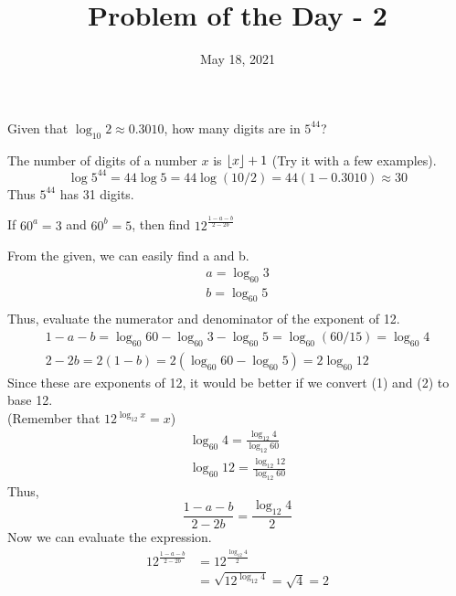 \documentclass[answers]{exam}
\title{Problem of the Day - 2}
\date{May 18, 2021}
\DeclarePairedDelimiter\floor{\lfloor}{\rfloor}
\begin{document}
	\maketitle
	\begin{questions}
		\question
		Given that $\log_{10}2 \approx 0.3010$, how many digits are in $5^{44}$?
		
		\begin{solution}
			The number of digits of a number $x$ is $\floor*{x} + 1$ (Try it with a few examples).
			\begin{equation*}
			\log 5^{44} = 44 \log 5 = 44 \log (10/2) = 44(1 - 0.3010) \approx 30
			\end{equation*}
			Thus $5^{44}$ has 31 digits.
		\end{solution}
	
		\question
		If $60^a = 3$ and $60^b = 5$, then find $12^{\frac{1 - a - b}{2-2b}}$
		
		\begin{solution}
			From the given, we can easily find a and b.
			\begin{gather*}
			a = \log_{60} 3 \\
			b = \log_{60} 5 \\
			\end{gather*}
			Thus, evaluate the numerator and denominator of the exponent of 12.
			\begin{gather}
			1 - a - b = \log_{60}60 - \log_{60} 3 - \log_{60} 5 = \log_{60}(60 / 15) = \log_{60} 4 \\
			2 - 2b = 2(1 - b) = 2\left (\log_{60}60 - \log_{60}5 \right) = 2\log_{60} 12
			\end{gather}
			Since these are exponents of 12, it would be better if we convert (1) and (2) to base 12. \\
			(Remember that $12^{\log_{12}x} = x$)
			\begin{gather*}
			\log_{60} 4 = \frac{\log_{12} 4}{\log_{12} 60} \\
			\log_{60} 12 = \frac{\log_{12} 12}{\log_{12} 60}
			\end{gather*}
			Thus,
			\begin{equation*}
			\frac{1 - a - b}{2 - 2b} = \frac{\log_{12} 4}{2}
			\end{equation*}
			Now we can evaluate the expression.
			\begin{align*}
			12^{\frac{1 - a - b}{2 - 2b}} &= 12^{\frac{\log_{12} 4}{2}} \\
			&= \sqrt{12^{\log_{12} 4}} = \sqrt{4} = 2
			\end{align*}
		\end{solution} 
	

\end{questions}
\end{document}
